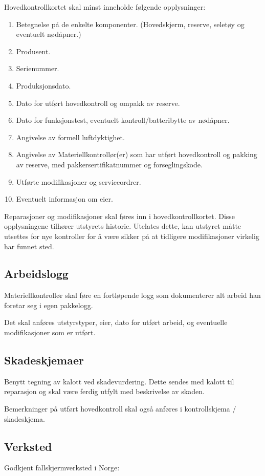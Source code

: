 Hovedkontrollkortet skal minst inneholde følgende opplysninger:
\begin{enumerate}
	\item Betegnelse på de enkelte komponenter. (Hovedskjerm, reserve, seletøy og eventuelt nødåpner.)
	\item Produsent.
	\item Serienummer.
	\item Produksjonsdato.
	\item Dato for utført hovedkontroll og ompakk av reserve.
	\item Dato for funksjonstest, eventuelt kontroll/batteribytte av nødåpner.
	\item Angivelse av formell luftdyktighet.
	\item Angivelse av Materiellkontrollør(er) som har utført hovedkontroll og pakking av reserve, med pakkersertifikatnummer og forseglingskode.
	\item Utførte modifikasjoner og serviceordrer.
	\item Eventuelt informasjon om eier.
\end{enumerate}

Reparasjoner og modifikasjoner skal føres inn i hovedkontrollkortet. Disse opplysningene tilhører utstyrets historie. Utelates dette, kan utstyret måtte utsettes for nye kontroller for å være sikker på at tidligere modifikasjoner virkelig har funnet sted.

\subsection{Arbeidslogg}
Materiellkontrollør skal føre en fortløpende logg som dokumenterer alt arbeid han foretar seg i egen pakkelogg.

Det skal anføres utstyrstyper, eier, dato for utført arbeid, og eventuelle modifikasjoner som er utført.

\subsection{Skadeskjemaer}
Benytt tegning av kalott ved skadevurdering. Dette sendes med kalott til reparasjon og skal være ferdig utfylt med beskrivelse av skaden.

Bemerkninger på utført hovedkontroll skal også anføres i kontrollskjema / skadeskjema.

\subsection{Verksted}
Godkjent fallskjermverksted i Norge:

